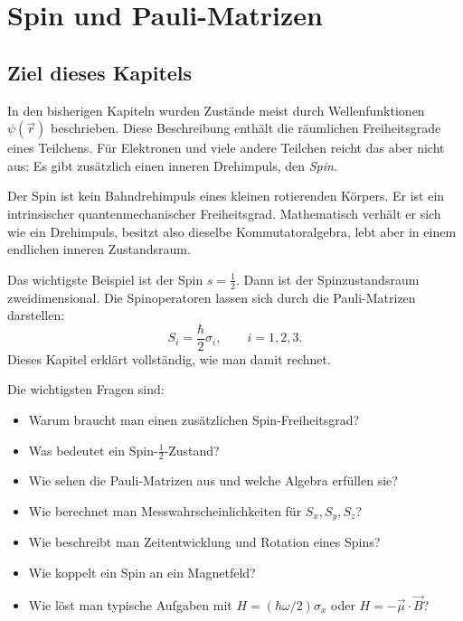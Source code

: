 \providecommand{\ket}[1]{\left|#1\right\rangle}
\providecommand{\bra}[1]{\left\langle#1\right|}
\providecommand{\braket}[2]{\left\langle#1\middle|#2\right\rangle}
\providecommand{\mel}[3]{\left\langle#1\middle|#2\middle|#3\right\rangle}
\providecommand{\dd}{\,\mathrm{d}}
\providecommand{\ii}{\mathrm{i}}
\providecommand{\e}{\mathrm{e}}
\providecommand{\idop}{\mathbf{1}}
\providecommand{\vecsigma}{\vec\sigma}
\providecommand{\vecS}{\vec S}
\providecommand{\vecB}{\vec B}
\providecommand{\epsijk}{\varepsilon_{ijk}}

\chapter{Spin und Pauli-Matrizen}

\section{Ziel dieses Kapitels}

In den bisherigen Kapiteln wurden Zustände meist durch Wellenfunktionen \(\psi(\vec r)\) beschrieben. Diese Beschreibung enthält die räumlichen Freiheitsgrade eines Teilchens. Für Elektronen und viele andere Teilchen reicht das aber nicht aus: Es gibt zusätzlich einen inneren Drehimpuls, den \emph{Spin}.

\begin{conceptbox}
Der Spin ist kein Bahndrehimpuls eines kleinen rotierenden Körpers. Er ist ein intrinsischer quantenmechanischer Freiheitsgrad. Mathematisch verhält er sich wie ein Drehimpuls, besitzt also dieselbe Kommutatoralgebra, lebt aber in einem endlichen inneren Zustandsraum.
\end{conceptbox}

Das wichtigste Beispiel ist der Spin \(s=\frac12\). Dann ist der Spinzustandsraum zweidimensional. Die Spinoperatoren lassen sich durch die Pauli-Matrizen darstellen:
\[
    S_i = \frac{\hbar}{2}\sigma_i,
    \qquad i=1,2,3.
\]
Dieses Kapitel erklärt vollständig, wie man damit rechnet.

Die wichtigsten Fragen sind:
\begin{itemize}
    \item Warum braucht man einen zusätzlichen Spin-Freiheitsgrad?
    \item Was bedeutet ein Spin-\(\frac12\)-Zustand?
    \item Wie sehen die Pauli-Matrizen aus und welche Algebra erfüllen sie?
    \item Wie berechnet man Messwahrscheinlichkeiten für \(S_x,S_y,S_z\)?
    \item Wie beschreibt man Zeitentwicklung und Rotation eines Spins?
    \item Wie koppelt ein Spin an ein Magnetfeld?
    \item Wie löst man typische Aufgaben mit \(H=(\hbar\omega/2)\sigma_x\) oder \(H=-\vec\mu\cdot\vec B\)?
\end{itemize}

